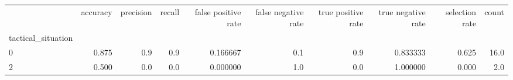 \begin{tabular}{lrrrrrrrrr}
\toprule
{} &  accuracy &  precision &  recall &  false positive rate &  false negative rate &  true positive rate &  true negative rate &  selection rate &  count \\
tactical\_situation &           &            &         &                      &                      &                     &                     &                 &        \\
\midrule
0                  &     0.875 &        0.9 &     0.9 &             0.166667 &                  0.1 &                 0.9 &            0.833333 &           0.625 &   16.0 \\
2                  &     0.500 &        0.0 &     0.0 &             0.000000 &                  1.0 &                 0.0 &            1.000000 &           0.000 &    2.0 \\
\bottomrule
\end{tabular}
